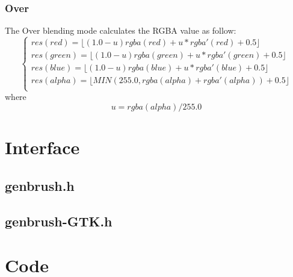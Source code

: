 \subsubsection{Over}

The Over blending mode calculates the RGBA value as follow:\\
\begin{equation}
\left\lbrace\begin{array}{l}
res(red)=\lfloor(1.0-u)rgba(red)+u*rgba'(red)+0.5\rfloor\\
res(green)=\lfloor(1.0-u)rgba(green)+u*rgba'(green)+0.5\rfloor\\
res(blue)=\lfloor(1.0-u)rgba(blue)+u*rgba'(blue)+0.5\rfloor\\
res(alpha)=\lfloor MIN(255.0,rgba(alpha)+rgba'(alpha))+0.5\rfloor\\
\end{array}\right.
\end{equation}
where 
\begin{equation}
u = rgba(alpha)/255.0
\end{equation}

\section{Interface}

\subsection{genbrush.h}

\begin{scriptsize}
\begin{ttfamily}

\end{ttfamily}
\end{scriptsize}

\subsection{genbrush-GTK.h}

\begin{scriptsize}
\begin{ttfamily}

\end{ttfamily}
\end{scriptsize}

\section{Code}

